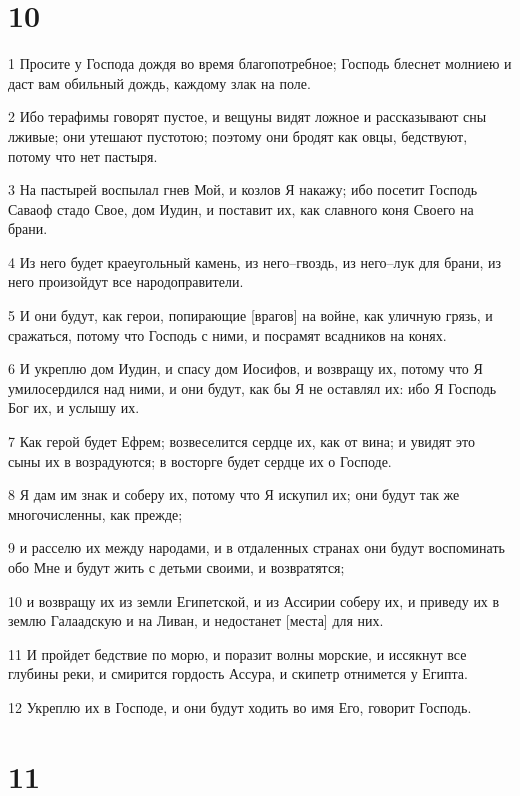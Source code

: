 \chapter{10}

\par 1 Просите у Господа дождя во время благопотребное; Господь блеснет молниею и даст вам обильный дождь, каждому злак на поле.
\par 2 Ибо терафимы говорят пустое, и вещуны видят ложное и рассказывают сны лживые; они утешают пустотою; поэтому они бродят как овцы, бедствуют, потому что нет пастыря.
\par 3 На пастырей воспылал гнев Мой, и козлов Я накажу; ибо посетит Господь Саваоф стадо Свое, дом Иудин, и поставит их, как славного коня Своего на брани.
\par 4 Из него будет краеугольный камень, из него--гвоздь, из него--лук для брани, из него произойдут все народоправители.
\par 5 И они будут, как герои, попирающие [врагов] на войне, как уличную грязь, и сражаться, потому что Господь с ними, и посрамят всадников на конях.
\par 6 И укреплю дом Иудин, и спасу дом Иосифов, и возвращу их, потому что Я умилосердился над ними, и они будут, как бы Я не оставлял их: ибо Я Господь Бог их, и услышу их.
\par 7 Как герой будет Ефрем; возвеселится сердце их, как от вина; и увидят это сыны их в возрадуются; в восторге будет сердце их о Господе.
\par 8 Я дам им знак и соберу их, потому что Я искупил их; они будут так же многочисленны, как прежде;
\par 9 и расселю их между народами, и в отдаленных странах они будут воспоминать обо Мне и будут жить с детьми своими, и возвратятся;
\par 10 и возвращу их из земли Египетской, и из Ассирии соберу их, и приведу их в землю Галаадскую и на Ливан, и недостанет [места] для них.
\par 11 И пройдет бедствие по морю, и поразит волны морские, и иссякнут все глубины реки, и смирится гордость Ассура, и скипетр отнимется у Египта.
\par 12 Укреплю их в Господе, и они будут ходить во имя Его, говорит Господь.

\chapter{11}

